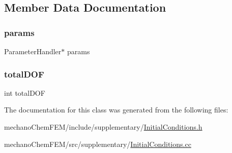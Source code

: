 \subsection{Member Data Documentation}
\mbox{\label{class_initial_conditions_a31d5e7a5228d9d55ba00fae854fcfaa0}} 
\subsubsection{\texorpdfstring{params}{params}}
{\footnotesize\ttfamily Parameter\+Handler$\ast$ params}

\mbox{\label{class_initial_conditions_acf5f14c806d215a0bf5c9f46d3e23607}} 
\subsubsection{\texorpdfstring{totalDOF}{totalDOF}}
{\footnotesize\ttfamily int total\+D\+OF}



The documentation for this class was generated from the following files\+:\begin{DoxyCompactItemize}
\item 
mechano\+Chem\+F\+E\+M/include/supplementary/\mbox{\hyperlink{_initial_conditions_8h}{Initial\+Conditions.\+h}}\item 
mechano\+Chem\+F\+E\+M/src/supplementary/\mbox{\hyperlink{_initial_conditions_8cc}{Initial\+Conditions.\+cc}}\end{DoxyCompactItemize}

